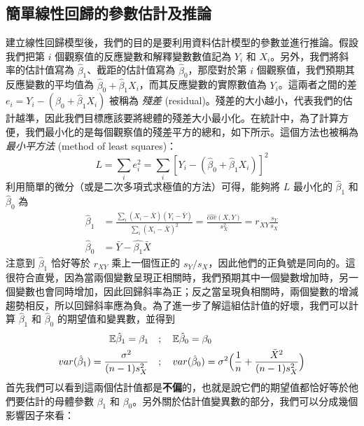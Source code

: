     \subsection{簡單線性回歸的參數估計及推論}

    建立線性回歸模型後，我們的目的是要利用資料估計模型的參數並進行推論。假設我們把第 $i$ 個觀察值的反應變數和解釋變數數值記為 $Y_i$ 和 $X_i$。另外，我們將斜率的估計值寫為 $\hat{\beta}_1$、截距的估計值寫為 $\hat{\beta}_0$，那麼對於第 $i$ 個觀察值，我們預期其反應變數的平均值為 $\hat{\beta}_0 + \hat{\beta}_1 X_i$，而其反應變數的實際數值為 $Y_i$。這兩者之間的差 $e_i = Y_i - (\hat{\beta}_0 + \hat{\beta}_1 X_i)$ 被稱為 \textit{殘差} (residual)。殘差的大小越小，代表我們的估計越準，因此我們目標應該要將總體的殘差大小最小化。在統計中，為了計算方便，我們最小化的是每個觀察值的殘差平方的總和，如下所示。這個方法也被稱為\textit{最小平方法} (method of least squares)：
    \[L = \sum_i e_i^2 = \sum_i  [Y_i - (\hat{\beta}_0 + \hat{\beta}_1 X_i)]^2\]
    利用簡單的微分（或是二次多項式求極值的方法）可得，能夠將 $L$ 最小化的 $\hat{\beta}_1$ 和 $\hat{\beta}_0$ 為
    \begin{align*}
        \hat{\beta}_1 &= \frac{\sum_i (X_i - \bar{X})(Y_i - \bar{Y})}{\sum_i (X_i-\bar{X})^2} = \frac{\widehat{cov}(X,Y)}{s_X^2} = r_{XY}\frac{s_Y}{s_X}\\
        \hat{\beta}_0 &= \bar{Y} - \hat{\beta_1}\bar{X}
    \end{align*}
    注意到 $\hat{\beta}_1$ 恰好等於 $r_{XY}$ 乘上一個恆正的 $s_Y / s_X$，因此他們的正負號是同向的。這很符合直覺，因為當兩個變數呈現正相關時，我們預期其中一個變數增加時，另一個變數也會同時增加，因此回歸斜率為正；反之當呈現負相關時，兩個變數的增減趨勢相反，所以回歸斜率應為負。為了進一步了解這組估計值的好壞，我們可以計算 $\hat{\beta}_1$ 和 $\hat{\beta}_0$ 的期望值和變異數，並得到
    \begin{align*}
        \mathbb{E}\hat{\beta}_1 = \beta_1 \quad &; \quad \mathbb{E}\hat{\beta}_0 = \beta_0\\
        var(\hat{\beta}_1) = \frac{\sigma^2}{(n-1)s_X^2} \quad &; \quad var(\hat{\beta}_0) = \sigma^2\Big(\frac{1}{n} + \frac{\bar{X}^2}{(n-1)s_X^2}\Big)
    \end{align*}
    首先我們可以看到這兩個估計值都是\textbf{不偏}的，也就是說它們的期望值都恰好等於他們要估計的母體參數 $\beta_1$ 和 $\beta_0$。另外關於估計值變異數的部分，我們可以分成幾個影響因子來看：
